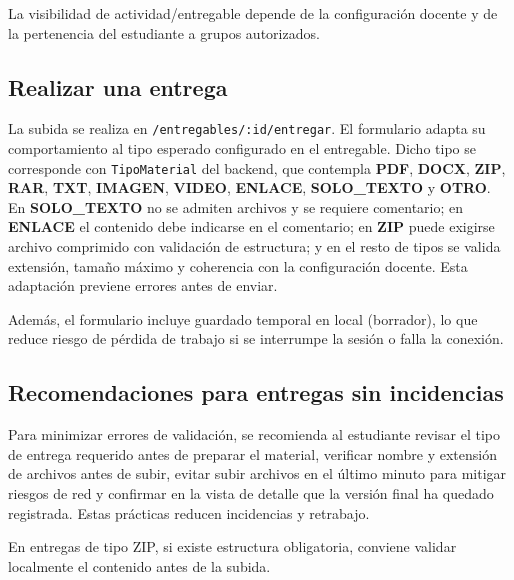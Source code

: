 La visibilidad de actividad/entregable depende de la configuraci\'on docente
y de la pertenencia del estudiante a grupos autorizados.

\subsection{Realizar una entrega}

La subida se realiza en \texttt{/entregables/:id/entregar}.
El formulario adapta su comportamiento al tipo esperado configurado en el
entregable. Dicho tipo se corresponde con \texttt{TipoMaterial} del backend,
que contempla \textbf{PDF}, \textbf{DOCX}, \textbf{ZIP}, \textbf{RAR},
\textbf{TXT}, \textbf{IMAGEN}, \textbf{VIDEO}, \textbf{ENLACE},
\textbf{SOLO\_TEXTO} y \textbf{OTRO}.
En \textbf{SOLO\_TEXTO} no se admiten archivos y se requiere comentario;
en \textbf{ENLACE} el contenido debe indicarse en el comentario;
en \textbf{ZIP} puede exigirse archivo comprimido con validaci\'on de estructura;
y en el resto de tipos se valida extensi\'on, tama\~no m\'aximo y coherencia
con la configuraci\'on docente. Esta adaptaci\'on previene errores antes de enviar.



Adem\'as, el formulario incluye guardado temporal en local
(borrador), lo que reduce riesgo de p\'erdida de trabajo
si se interrumpe la sesi\'on o falla la conexi\'on.

\subsection{Recomendaciones para entregas sin incidencias}

Para minimizar errores de validaci\'on, se recomienda al estudiante revisar el tipo de entrega requerido antes de preparar el material, verificar nombre y extensi\'on de archivos antes de subir, evitar subir archivos en el \'ultimo minuto para mitigar riesgos de red y confirmar en la vista de detalle que la versi\'on final ha quedado registrada. Estas pr\'acticas reducen incidencias y retrabajo.

En entregas de tipo ZIP,
si existe estructura obligatoria,
conviene validar localmente el contenido antes de la subida.

